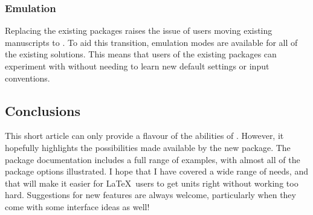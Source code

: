 \begin{bibunit}
\subsubsection{Emulation}

Replacing the existing packages raises the issue of users
moving existing manuscripts to .  To aid this
transition, emulation modes are available for all of the
existing solutions.  This means that users of the existing
packages can experiment with  without needing to
learn new default settings or input conventions.

\subsection{Conclusions}

This short article can only provide a flavour of the abilities
of .  However, it hopefully highlights the
possibilities made available by the new package.  The package
documentation includes a full range of examples, with almost
all of the package options illustrated.  I hope that I have
covered a wide range of needs, and that  will make
it easier for \LaTeX\ users to get units right without working
too hard.  Suggestions for new features are always welcome,
particularly when they come with some interface ideas as well!

\putbib[siunitx]
\end{bibunit}

%
%
